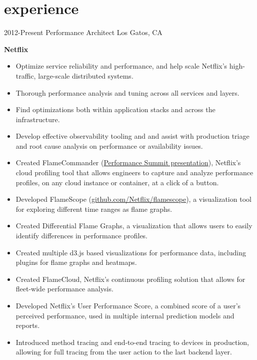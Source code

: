 \section{experience}

\begin{entrylist}
  \entry
    {2012-Present}
    {Performance Architect}
    {Los Gatos, CA}
    {
      \textbf{Netflix}
      \begin{itemize}
        \item Optimize service reliability and performance, and help scale Netflix's high-traffic, large-scale distributed systems.
        \item Thorough performance analysis and tuning across all services and layers.
        \item Find optimizations both within application stacks and across the infrastructure.
        \item Develop effective observability tooling and and assist with production triage and root cause analysis on performance or availability issues.  
      \end{itemize}
      \begin{itemize}
        \item Created FlameCommander (\href{https://www.youtube.com/watch?v=L58GrWcrD00}{Performance Summit presentation}), Netflix's cloud profiling tool that allows engineers to capture and analyze performance profiles, on any cloud instance or container, at a click of a button.
        \item Developed FlameScope (\href{https://github.com/Netflix/flamescope}{github.com/Netflix/flamescope}), a visualization tool for exploring different time ranges as flame graphs.
        \item Created Differential Flame Graphs, a visualization that allows users to easily identify differences in performance profiles.
        \item Created multiple d3.js based visualizations for performance data, including plugins for flame graphs and heatmaps.
        \item Created FlameCloud, Netflix's continuous profiling solution that allows for fleet-wide performance analysis.
        \item Developed Netflix's User Performance Score, a combined score of a user's perceived performance, used in multiple internal prediction models and reports.
        \item Introduced method tracing and end-to-end tracing to devices in production, allowing for full tracing from the user action to the last backend layer.

\end{itemize}}
\end{entrylist}
